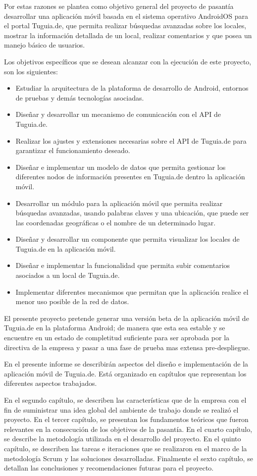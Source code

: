 Por estas razones se plantea como objetivo general del proyecto de pasantía desarrollar una aplicación móvil basada en el sistema operativo AndroidOS para el portal Tuguia.de, que permita realizar búsquedas avanzadas sobre los locales, mostrar la información detallada de un local, realizar comentarios y que posea un manejo básico de usuarios.

Los objetivos específicos que se desean alcanzar con la ejecución de este proyecto, son los siguientes:

 \begin{itemize}
\item Estudiar la arquitectura de la plataforma de desarrollo de Android, entornos de pruebas y demás tecnologías asociadas.
\item Diseñar y desarrollar un mecanismo de comunicación con el API de Tuguia.de.
\item Realizar los ajustes y extensiones necesarias sobre el API de Tuguia.de para garantizar el funcionamiento deseado.
\item Diseñar e implementar un modelo de datos que permita gestionar los diferentes nodos de información presentes en Tuguia.de dentro la aplicación móvil. 
\item Desarrollar un módulo para la aplicación móvil que permita realizar búsquedas avanzadas, usando palabras claves y una ubicación, que puede ser las coordenadas geográficas o el nombre de un determinado lugar.
\item Diseñar y desarrollar un componente que permita visualizar los locales de Tuguia.de en la aplicación móvil.  
\item Diseñar e implementar la funcionalidad que permita subir comentarios asociados a un local de Tuguia.de.
\item Implementar diferentes mecanismos que permitan que la aplicación realice el menor uso posible de la red de datos.

\end{itemize}

El presente proyecto pretende generar una versión beta de la aplicación móvil de Tuguia.de en la plataforma Android; de manera que esta sea estable y se encuentre en un estado de completitud suficiente para ser aprobada por la directiva de la empresa y pasar a una fase de prueba mas extensa pre-despliegue.

En el presente informe se describirán aspectos del diseño e implementación de la aplicación móvil de Tuguia.de. Está organizado en capítulos que representan los diferentes aspectos trabajados. 

En el segundo capítulo, se describen las características que de la empresa con el fin de suministrar una idea global del ambiente de trabajo donde se realizó el proyecto. En el tercer capítulo, se presentan los fundamentos teóricos que fueron relevantes en la consecución de los objetivos de la pasantía. En el cuarto capítulo, se describe la metodología utilizada en el desarrollo del proyecto. En el quinto capítulo, se describen las tareas e iteraciones que se realizaron en el marco de la metodología Scrum y las soluciones desarrolladas. Finalmente el sexto capítulo, se detallan las conclusiones y recomendaciones futuras para el proyecto.